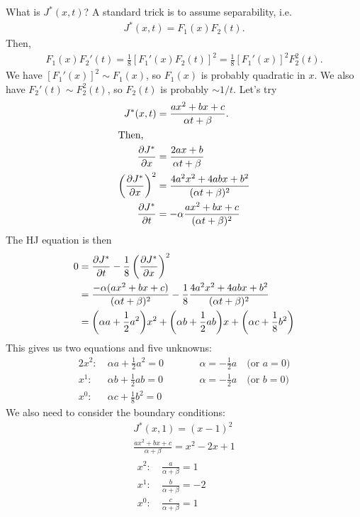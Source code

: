 What is $J^*(x,t)$? A standard trick is to assume separability, i.e.\
\begin{gather}
  J^*(x,t) = F_1(x) F_2(t).
\end{gather}
Then,
\begin{gather}
  F_1(x) F_2'(t) = \frac{1}{8} [F_1'(x) F_2(t)]^2 = \frac{1}{8} [F_1'(x)]^2 F_2^2(t).
\end{gather}
We have $[F_1'(x)]^2\sim F_1(x)$, so $F_1(x)$ is probably quadratic in $x$. We also have $F_2'(t)\sim F_2^2(t)$, so $F_2(t)$ is probably $\sim 1/t$. Let's try
\begin{align}
  J^*(x,t) &= \frac{ax^2 + bx + c}{\alpha t + \beta}. \\
  \shortintertext{Then,}
  \frac{\partial J^*}{\partial x} &= \frac{2ax + b}{\alpha t + \beta} \\
  \left(\frac{\partial J^*}{\partial x}\right)^2 &= \frac{4a^2x^2 + 4abx + b^2}{(\alpha t + \beta)^2} \\
  \frac{\partial J^*}{\partial t} &= -\alpha \frac{ax^2 + bx + c}{(\alpha t + \beta)^2}
\end{align}
The HJ equation is then
\begin{align}
  0 &= \frac{\partial J^*}{\partial t} - \frac{1}{8} \left(\frac{\partial J^*}{\partial x}\right)^2 \\
    &= \frac{-\alpha(ax^2 + bx + c)}{(\alpha t + \beta)^2} - \frac{1}{8} \frac{4a^2x^2 + 4abx + b^2}{(\alpha t + \beta)^2} \\
    &= \bigg(\alpha a + \frac12 a^2\bigg) x^2 + \bigg(\alpha b + \frac12 ab\bigg) x + \bigg(\alpha c + \frac18 b^2\bigg)
\end{align}
This gives us two equations and five unknowns:
\begin{alignat}{2}
  x^2:\ & \alpha a + \frac12 a^2 = 0 & \qquad & \alpha = -\frac12 a \quad \text{(or $a=0$)} \\
  x^1:\ & \alpha b + \frac12 ab = 0 && \alpha = -\frac12 a \quad \text{(or $b=0$)} \\
  x^0:\ & \alpha c + \frac18 b^2 = 0
\end{alignat}
We also need to consider the boundary conditions:
\begin{gather}
  J^*(x,1) = (x-1)^2 \\
  \frac{ax^2 + bx + c}{\alpha + \beta} = x^2 - 2x + 1 \\
  \begin{aligned}
    x^2:\ & \frac{a}{\alpha+\beta} = 1 \\
    x^1:\ & \frac{b}{\alpha+\beta} = -2 \\
    x^0:\ & \frac{c}{\alpha+\beta} = 1
  \end{aligned}
\end{gather}
